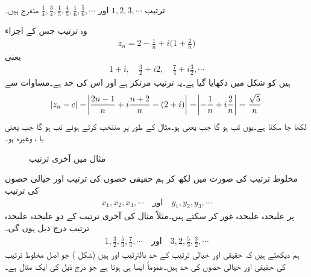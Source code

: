 ترتیب
$1,2,3,\cdots$
اور
$\tfrac{1}{4},\tfrac{3}{4},\tfrac{1}{5},\tfrac{4}{5},\tfrac{1}{6},\tfrac{5}{6},\cdots$
منفرج ہیں۔

وہ ترتیب جس کے اجزاء 
\begin{align*}
z_n=2-\frac{1}{n}+i\big(1+\frac{2}{n}\big)
\end{align*}
یعنی
\begin{align*}
1+i,\quad \frac{3}{2}+i2,\quad \frac{7}{4}+i\frac{3}{2},\cdots
\end{align*}
ہیں کو شکل میں دکھایا گیا ہے۔یہ ترتیب مرتکز ہے اور اس کی حد  ہے۔مساوات  سے
\begin{align*}
\abs{z_n-c}=\abs{\frac{2n-1}{n}+i\frac{n+2}{n}-(2+i)}=\abs{-\frac{1}{n}+i\frac{2}{n}}=\frac{\sqrt{5}}{n}
\end{align*}
لکھا جا سکتا ہے۔یوں  تب ہو گا جب  یعنی  ہو۔مثال کے طور پر  منتخب کرتے ہوئے   تب ہو گا جب  یعنی
 یا ، وغیرہ ہو۔
\begin{figure}
\centering
{}
\caption{مثال  میں آخری ترتیب}
\label{شکل_مثال_ترتیب_مرتکز_اور_منفرج_ترتیب}
\end{figure}
مخلوط ترتیب  کی صورت میں  لکھ کر ہم حقیقی حصوں کی ترتیب اور خیالی حصوں کی ترتیب
\begin{align*}
x_1,x_2,x_3,\cdots\quad \text{اور}\quad y_1,y_2,y_3,\cdots
\end{align*}
 پر علیحدہ علیحدہ غور کر سکتے ہیں۔مثلاً  مثال  کی آخری ترتیب کے دو علیحدہ علیحدہ ترتیب درج ذیل ہوں گی۔
\begin{align*}
1,\frac{3}{2},\frac{5}{3},\frac{7}{4},\cdots \quad \text{اور}\quad 3,2,\frac{5}{3},\frac{3}{2},\cdots
\end{align*}
ہم دیکھتے ہیں کہ حقیقی اور خیالی ترتیب کے حد  بالترتیب  اور  ہیں (شکل ) جو اصل مخلوط ترتیب کی حقیقی اور خیالی حصوں کی حد ہیں۔عموماً ایسا ہی ہوتا ہے جو درج ذیل کی ایک مثال ہے۔ 

